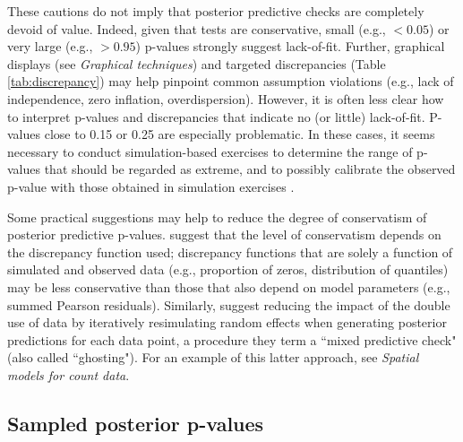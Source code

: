\documentclass[12pt,english]{article}
\begin{document}
\begin{spacing}{1.9}
These cautions do not imply that posterior predictive checks are
completely devoid of value.  Indeed, given that tests are
conservative, small (e.g., $<0.05$) or very large (e.g., $>0.95$)
p-values strongly suggest lack-of-fit.  Further, graphical displays
(see \textit{Graphical techniques}) and targeted discrepancies (Table
\ref{tab:discrepancy}) may help pinpoint common assumption violations
(e.g., lack of independence, zero inflation, overdispersion).
However, it is often less clear how to interpret p-values and
discrepancies that indicate no (or little) lack-of-fit. P-values close
to 0.15 or 0.25 are especially problematic.  In these cases, it seems
necessary to conduct simulation-based exercises to determine the range
of p-values that should be regarded as extreme, and to possibly
calibrate the observed p-value with those obtained in simulation
exercises \citep[e.g.,][]{DeyEtAl1998,HjortEtAl2006}.

Some practical suggestions may help to reduce the degree of
conservatism of posterior predictive p-values.  \citet{LunnEtAl2013}
suggest that the level of conservatism depends on the discrepancy
function used; discrepancy functions that are solely a function of
simulated and observed data (e.g., proportion of zeros, distribution
of quantiles) may be less conservative than those that also depend on
model parameters (e.g., summed Pearson residuals).  Similarly,
\citet{MarshallSpiegelhalter2003} suggest reducing the impact of the
double use of data by iteratively resimulating random effects when
generating posterior predictions for each data point, a procedure they
term a ``mixed predictive check" (also called ``ghosting").  For an
example of this latter approach, see \textit{Spatial models for count
  data}.

\subsection{Sampled posterior p-values}


\end{spacing}
\end{document}
